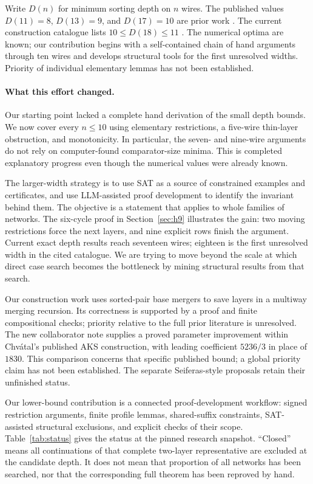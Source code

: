 \documentclass[11pt]{article}
\begin{document}
Write $D(n)$ for minimum sorting depth on $n$ wires. The published values $D(11)=8$, $D(13)=9$, and $D(17)=10$ are prior work \cite{bundala,codish}. The current construction catalogue lists $10\le D(18)\le11$ \cite{catalogue}. The numerical optima are known; our contribution begins with a self-contained chain of hand arguments through ten wires and develops structural tools for the first unresolved widths. Priority of individual elementary lemmas has not been established.

\paragraph{What this effort changed.}
Our starting point lacked a complete hand derivation of the small depth bounds. We now cover every $n\le10$ using elementary restrictions, a five-wire thin-layer obstruction, and monotonicity. In particular, the seven- and nine-wire arguments do not rely on computer-found comparator-size minima. This is completed explanatory progress even though the numerical values were already known.

The larger-width strategy is to use SAT as a source of constrained examples and certificates, and use LLM-assisted proof development to identify the invariant behind them. The objective is a statement that applies to whole families of networks. The six-cycle proof in Section~\ref{sec:h9} illustrates the gain: two moving restrictions force the next layers, and nine explicit rows finish the argument. Current exact depth results reach seventeen wires; eighteen is the first unresolved width in the cited catalogue. We are trying to move beyond the scale at which direct case search becomes the bottleneck by mining structural results from that search.

Our construction work uses sorted-pair base mergers to save layers in a multiway merging recursion. Its correctness is supported by a proof and finite compositional checks; priority relative to the full prior literature is unresolved. The new collaborator note supplies a proved parameter improvement within Chv\'atal's published AKS construction, with leading coefficient $5236/3$ in place of $1830$. This comparison concerns that specific published bound; a global priority claim has not been established. The separate Seiferas-style proposals retain their unfinished status.

Our lower-bound contribution is a connected proof-development workflow: signed restriction arguments, finite profile lemmas, shared-suffix constraints, SAT-assisted structural exclusions, and explicit checks of their scope. Table~\ref{tab:status} gives the status at the pinned research snapshot. ``Closed'' means all continuations of that complete two-layer representative are excluded at the candidate depth. It does not mean that proportion of all networks has been searched, nor that the corresponding full theorem has been reproved by hand.
\end{document}
